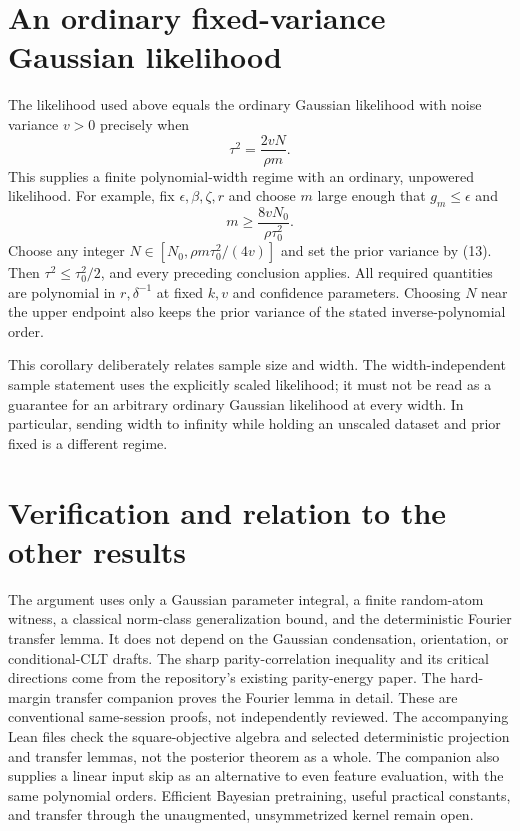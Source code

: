 \documentclass[11pt]{article}
\begin{document}
\section{An ordinary fixed-variance Gaussian likelihood}
The likelihood used above equals the ordinary Gaussian likelihood with
noise variance $v>0$ precisely when
\[
                    \tau^2=\frac{2vN}{\rho m}.           \tag{13}
\]
This supplies a finite polynomial-width regime with an ordinary,
unpowered likelihood. For example, fix $\epsilon,\beta,\zeta,r$ and
choose $m$ large enough that $g_m\le\epsilon$ and
\[
                 m\ge\frac{8vN_0}{\rho\tau_0^2}.
\]
Choose any integer
$N\in[N_0,\rho m\tau_0^2/(4v)]$ and set the prior variance by (13).
Then $\tau^2\le\tau_0^2/2$, and every preceding conclusion applies.
All required quantities are polynomial in $r,\delta^{-1}$ at fixed $k,v$
and confidence parameters. Choosing $N$ near the upper endpoint also
keeps the prior variance of the stated inverse-polynomial order.

This corollary deliberately relates sample size and width. The
width-independent sample statement uses the explicitly scaled likelihood;
it must not be read as a guarantee for an arbitrary ordinary Gaussian
likelihood at every width. In particular, sending width to infinity while
holding an unscaled dataset and prior fixed is a different regime.

\section{Verification and relation to the other results}
The argument uses only a Gaussian parameter integral, a finite
random-atom witness, a classical norm-class generalization bound, and
the deterministic Fourier transfer lemma. It does not depend on the
Gaussian condensation, orientation, or conditional-CLT drafts.
The sharp parity-correlation inequality and its critical directions
come from the repository's existing parity-energy paper.
The hard-margin transfer companion proves the Fourier lemma in detail.
These are conventional same-session proofs, not independently reviewed.
The accompanying Lean files check the square-objective algebra and
selected deterministic projection and transfer lemmas, not the posterior
theorem as a whole. The companion also supplies a linear input skip as an alternative to even
feature evaluation, with the same polynomial orders. Efficient Bayesian
pretraining, useful practical constants, and transfer through the
unaugmented, unsymmetrized kernel remain open.
\end{document}
